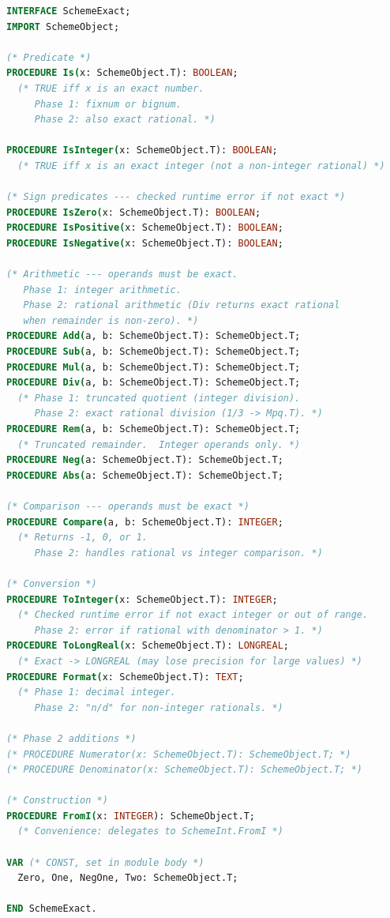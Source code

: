 \documentclass[12pt]{article}
\begin{document}
\begin{lstlisting}[language=Modula3]
INTERFACE SchemeExact;
IMPORT SchemeObject;

(* Predicate *)
PROCEDURE Is(x: SchemeObject.T): BOOLEAN;
  (* TRUE iff x is an exact number.
     Phase 1: fixnum or bignum.
     Phase 2: also exact rational. *)

PROCEDURE IsInteger(x: SchemeObject.T): BOOLEAN;
  (* TRUE iff x is an exact integer (not a non-integer rational) *)

(* Sign predicates --- checked runtime error if not exact *)
PROCEDURE IsZero(x: SchemeObject.T): BOOLEAN;
PROCEDURE IsPositive(x: SchemeObject.T): BOOLEAN;
PROCEDURE IsNegative(x: SchemeObject.T): BOOLEAN;

(* Arithmetic --- operands must be exact.
   Phase 1: integer arithmetic.
   Phase 2: rational arithmetic (Div returns exact rational
   when remainder is non-zero). *)
PROCEDURE Add(a, b: SchemeObject.T): SchemeObject.T;
PROCEDURE Sub(a, b: SchemeObject.T): SchemeObject.T;
PROCEDURE Mul(a, b: SchemeObject.T): SchemeObject.T;
PROCEDURE Div(a, b: SchemeObject.T): SchemeObject.T;
  (* Phase 1: truncated quotient (integer division).
     Phase 2: exact rational division (1/3 -> Mpq.T). *)
PROCEDURE Rem(a, b: SchemeObject.T): SchemeObject.T;
  (* Truncated remainder.  Integer operands only. *)
PROCEDURE Neg(a: SchemeObject.T): SchemeObject.T;
PROCEDURE Abs(a: SchemeObject.T): SchemeObject.T;

(* Comparison --- operands must be exact *)
PROCEDURE Compare(a, b: SchemeObject.T): INTEGER;
  (* Returns -1, 0, or 1.
     Phase 2: handles rational vs integer comparison. *)

(* Conversion *)
PROCEDURE ToInteger(x: SchemeObject.T): INTEGER;
  (* Checked runtime error if not exact integer or out of range.
     Phase 2: error if rational with denominator > 1. *)
PROCEDURE ToLongReal(x: SchemeObject.T): LONGREAL;
  (* Exact -> LONGREAL (may lose precision for large values) *)
PROCEDURE Format(x: SchemeObject.T): TEXT;
  (* Phase 1: decimal integer.
     Phase 2: "n/d" for non-integer rationals. *)

(* Phase 2 additions *)
(* PROCEDURE Numerator(x: SchemeObject.T): SchemeObject.T; *)
(* PROCEDURE Denominator(x: SchemeObject.T): SchemeObject.T; *)

(* Construction *)
PROCEDURE FromI(x: INTEGER): SchemeObject.T;
  (* Convenience: delegates to SchemeInt.FromI *)

VAR (* CONST, set in module body *)
  Zero, One, NegOne, Two: SchemeObject.T;

END SchemeExact.
\end{lstlisting}
\end{document}
